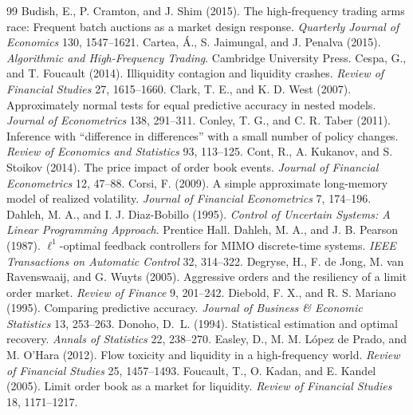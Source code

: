 \documentclass[12pt]{article}
\theoremstyle{definition}
\theoremstyle{remark}
\begin{document}
\begin{thebibliography}{99}
 Budish, E., P. Cramton, and J. Shim (2015). The high-frequency trading arms race: Frequent batch auctions as a market design response. \emph{Quarterly Journal of Economics} 130, 1547--1621.
 Cartea, \'A., S. Jaimungal, and J. Penalva (2015). \emph{Algorithmic and High-Frequency Trading}. Cambridge University Press.
 Cespa, G., and T. Foucault (2014). Illiquidity contagion and liquidity crashes. \emph{Review of Financial Studies} 27, 1615--1660.
 Clark, T. E., and K. D. West (2007). Approximately normal tests for equal predictive accuracy in nested models. \emph{Journal of Econometrics} 138, 291--311.
 Conley, T. G., and C. R. Taber (2011). Inference with ``difference in differences'' with a small number of policy changes. \emph{Review of Economics and Statistics} 93, 113--125.
 Cont, R., A. Kukanov, and S. Stoikov (2014). The price impact of order book events. \emph{Journal of Financial Econometrics} 12, 47--88.
 Corsi, F. (2009). A simple approximate long-memory model of realized volatility. \emph{Journal of Financial Econometrics} 7, 174--196.
 Dahleh, M. A., and I. J. Diaz-Bobillo (1995). \emph{Control of Uncertain Systems: A Linear Programming Approach}. Prentice Hall.
 Dahleh, M. A., and J. B. Pearson (1987). $\ell^1$-optimal feedback controllers for MIMO discrete-time systems. \emph{IEEE Transactions on Automatic Control} 32, 314--322.
 Degryse, H., F. de Jong, M. van Ravenswaaij, and G. Wuyts (2005). Aggressive orders and the resiliency of a limit order market. \emph{Review of Finance} 9, 201--242.
 Diebold, F. X., and R. S. Mariano (1995). Comparing predictive accuracy. \emph{Journal of Business \& Economic Statistics} 13, 253--263.
 Donoho, D.~L. (1994). Statistical estimation and optimal recovery. \emph{Annals of Statistics} 22, 238--270.
 Easley, D., M. M. L\'opez de Prado, and M. O'Hara (2012). Flow toxicity and liquidity in a high-frequency world. \emph{Review of Financial Studies} 25, 1457--1493.
 Foucault, T., O. Kadan, and E. Kandel (2005). Limit order book as a market for liquidity. \emph{Review of Financial Studies} 18, 1171--1217.

\end{thebibliography}
\end{document}
